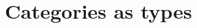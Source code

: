 \documentclass[11pt]{report}
\theoremstyle{definition}
\theoremstyle{plain}
\begin{document}
\chapter{Categories as types}\label{sec:cat-as-types}

 

\end{document}
